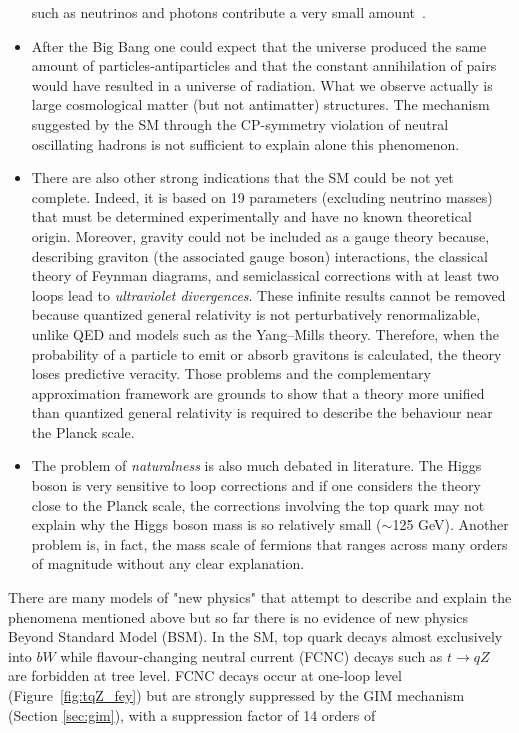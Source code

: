\begin{itemize}
such as neutrinos and photons contribute a very small amount~\cite{plank}. 
\item After the Big Bang one could expect that the universe produced the same amount of particles-antiparticles and that the constant annihilation
of pairs would have resulted in a universe of radiation. What we observe actually is large cosmological matter (but not antimatter) structures.
The mechanism suggested by the SM through the CP-symmetry violation of neutral oscillating hadrons is not sufficient to explain alone this phenomenon.
\item There are also other strong indications that the SM could be not yet complete. Indeed, it is based on 19 parameters (excluding neutrino masses)
that must be determined experimentally and have no known theoretical origin.  Moreover, gravity could not be included as a gauge theory because, 
describing graviton (the associated gauge boson) interactions, the classical theory of  Feynman diagrams, and semiclassical corrections with 
at least two loops lead to \textit{ultraviolet divergences}. These infinite results cannot be removed 
because quantized general relativity is not perturbatively renormalizable, unlike QED and models such as the Yang–Mills theory. 
Therefore, when the probability of a particle to emit or absorb gravitons is calculated, the theory loses predictive veracity. 
Those problems and the complementary approximation framework are grounds to show that a theory more unified than quantized general relativity is 
required to describe the behaviour near the Planck scale. 
\item The problem of \textit{naturalness} is also much debated in literature. The Higgs boson is very sensitive to loop corrections and if one considers the theory close to the Planck scale, the corrections involving the top quark may not explain why the Higgs boson mass is so relatively small ($\sim$125 GeV). Another problem is, in fact, the mass scale of fermions that ranges across many orders of magnitude without any clear explanation.
\end{itemize}
There are many models of "new physics" that attempt to describe and explain the phenomena mentioned above but so far there is no evidence of new physics Beyond Standard Model (BSM). 
In the SM, top quark decays almost exclusively into $bW$ while flavour-changing neutral current (FCNC) decays such as $t\rightarrow qZ$ are forbidden at tree level. 
FCNC decays occur at one-loop level (Figure~\ref{fig:tqZ_fey}) but are strongly suppressed by the GIM mechanism (Section \ref{sec:gim}), with a suppression factor of 14 orders of
